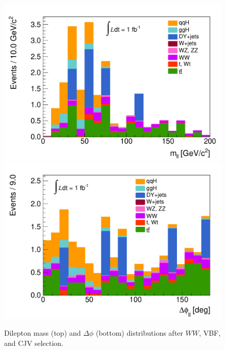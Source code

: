 \begin{figure}[!htbp]
\begin{center}
\includegraphics[scale=0.5]{figures/mll.pdf}
\includegraphics[scale=0.5]{figures/dphi.pdf}
\caption{Dilepton mass (top) and $\Delta\phi$ (bottom) distributions after $WW$, VBF, and CJV selection.}
\label{fig:vbfdilepton}
\end{center}
\end{figure}

